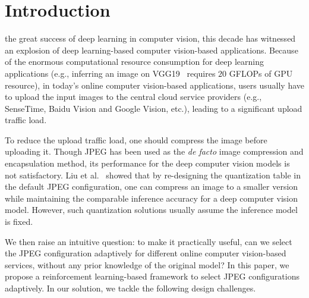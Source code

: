 \section{Introduction}
\label{Section: introduction}

 the great success of deep learning in computer vision, this decade has witnessed an explosion of deep learning-based computer vision-based applications. Because of the enormous computational resource consumption for deep learning applications (e.g., inferring an image on VGG19~\cite{VGG19} requires $20$ GFLOPs of GPU resource), in today's online computer vision-based applications, users usually have to upload the input images to the central cloud service providers (e.g., SenseTime, Baidu Vision and Google Vision, etc.), leading to a significant upload traffic load. 

To reduce the upload traffic load, one should compress the image before uploading it. Though JPEG has been used as the \emph{de facto} image compression and encapsulation method, its performance for the deep computer vision models is not satisfactory. Liu et al.~\cite{DeepN-JPEG} showed that by re-designing the quantization table in the default JPEG configuration, one can compress an image to a smaller version while maintaining the comparable inference accuracy for a deep computer vision model. However, such quantization solutions usually assume the inference model is fixed. 

We then raise an intuitive question: to make it practically useful, can we select the JPEG configuration adaptively for different online computer vision-based services, without any prior knowledge of the original model? In this paper, we propose a reinforcement learning-based framework to select JPEG configurations adaptively. In our solution, we tackle the following design challenges.

